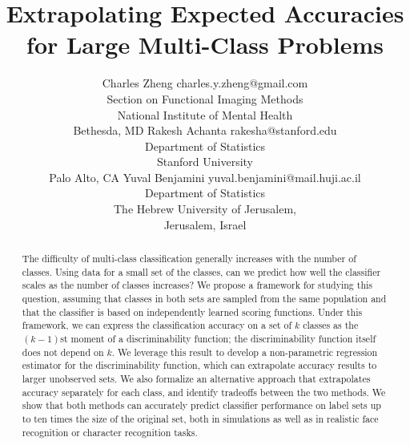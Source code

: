 \documentclass[twoside,11pt]{article}
\begin{document}
\title{Extrapolating Expected Accuracies for Large Multi-Class Problems}


\author{\name Charles Zheng \email charles.y.zheng@gmail.com \\
       \addr Section on Functional Imaging Methods\\
       National Institute of Mental Health\\
       Bethesda, MD
       \AND
       \name Rakesh Achanta \email rakesha@stanford.edu \\
       \addr Department of Statistics\\
       Stanford University\\
       Palo Alto, CA
       \AND
       \name Yuval Benjamini \email yuval.benjamini@mail.huji.ac.il \\
       \addr Department of Statistics\\
       The Hebrew University of Jerusalem,\\
       Jerusalem, Israel}

\maketitle

\begin{abstract}%
The difficulty of multi-class classification generally increases with the number of classes. Using data for a small set of the classes, can we predict how well the classifier scales as the number of classes increases? We propose a framework for studying this question, assuming that classes in both sets are sampled from the same population and that the classifier is based on independently learned scoring functions. Under this framework, we can express the classification accuracy on a set of $k$ classes as the $(k - 1)$st moment of a discriminability function; the discriminability function itself does not depend on $k$. We leverage this result to develop a non-parametric regression estimator for the discriminability function, which can extrapolate accuracy results to larger unobserved sets. We also formalize an alternative approach that extrapolates accuracy separately for each class, and identify tradeoffs between the two methods. We show that both methods can accurately predict classifier performance on label sets up to ten times the size of the original set, both in simulations as well as in realistic face recognition or character recognition tasks.
\end{abstract}
\end{document}
